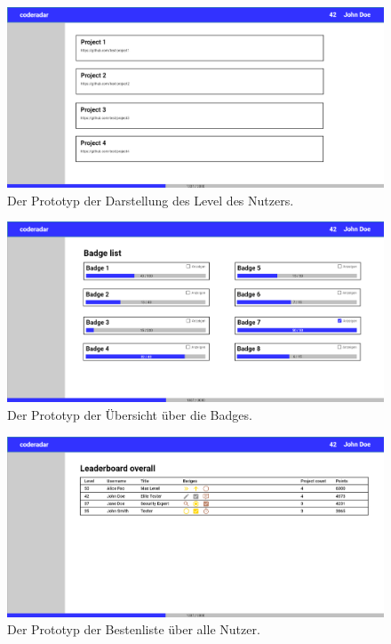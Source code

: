 \documentclass[
	oneside,  %
	ngerman, 
	final, 
	11pt, 
	a4paper, 
	1.1headlines, 
	headinclude=false, 
	footinclude=false, 
	mpinclude=false, 
	pagesize, 
	onecolumn, 
	titlepage, 
	parskip=half, 
	headsepline, 
	chapterprefix=false, 
	version=first, 
	listof=totoc, 
	bibliography=totoc, 
	toc=graduated, 
	fleqn
]{scrbook}
\begin{document}
\begin{figure}[htb]
	\begin{center}
		\includegraphics[width=\linewidth]{images/mock_level}
		\caption{Der Prototyp der Darstellung des Level des Nutzers.}
		\label{mock_level}
	\end{center}
\end{figure}

\begin{figure}[htb]
	\begin{center}
		\includegraphics[width=\linewidth]{images/mock_badge_list}
		\caption{Der Prototyp der Übersicht über die Badges.}
		\label{mock_badge_list}
	\end{center}
\end{figure}

\begin{figure}[htb]
	\begin{center}
		\includegraphics[width=\linewidth]{images/mock_leaderboards_global}
		\caption{Der Prototyp der Bestenliste über alle Nutzer.}
		\label{mock_leaderboards_global}
	\end{center}
\end{figure}
\end{document}
